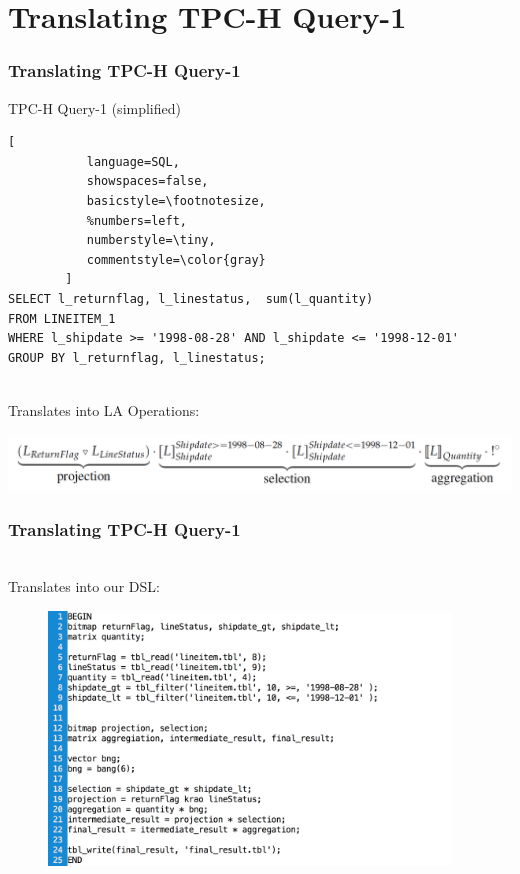 \documentclass{beamer}
\begin{document}
\section{Translating TPC-H Query-1}
\begin{frame}[fragile]
\frametitle{Translating TPC-H Query-1}

\begin{block}{TPC-H Query-1 (simplified)}
\begin{lstlisting}[
           language=SQL,
           showspaces=false,
           basicstyle=\footnotesize,
           %numbers=left,
           numberstyle=\tiny,
           commentstyle=\color{gray}
        ]
SELECT l_returnflag, l_linestatus,  sum(l_quantity)
FROM LINEITEM_1
WHERE l_shipdate >= '1998-08-28' AND l_shipdate <= '1998-12-01' 
GROUP BY l_returnflag, l_linestatus;
\end{lstlisting}
\end{block}

\\Translates into LA Operations:\par 

\includegraphics[width=\textwidth]{querie_1_la.png}

\end{frame}

\begin{frame}[fragile]
\frametitle{Translating TPC-H Query-1}

\\Translates into our DSL:\par 

\begin{figure}
    \includegraphics[width=0.95\textwidth,keepaspectratio]{querie-1.png}
\end{figure}


\end{frame}
\end{document}
